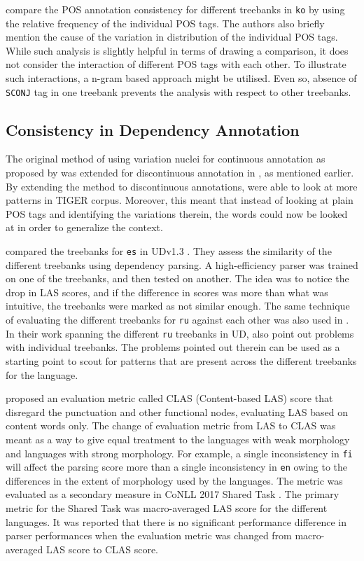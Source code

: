 \cite{korean} compare the POS annotation consistency for different treebanks in \verb|ko| by using the relative frequency of the individual POS tags. The authors also briefly mention the cause of the variation in distribution of the individual POS tags. While such analysis is slightly helpful in terms of drawing a comparison, it does not consider the interaction of different POS tags with each other. To illustrate such interactions, a n-gram based approach might be utilised. Even so, absence of \verb|SCONJ| tag in one treebank prevents the analysis with respect to other treebanks.

\subsection{Consistency in Dependency Annotation}
\label{ssec:inconsistency-detection-deprel}

The original method of using variation nuclei for continuous annotation as proposed by \cite{dickinson03a, dickinson03b} was extended for discontinuous annotation in \cite{dickinson05}, as mentioned earlier. By extending the method to discontinuous annotations, \citeauthor{dickinson05} were able to look at more patterns in TIGER corpus. Moreover, this meant that instead of looking at plain POS tags and identifying the variations therein, the words could now be looked at in order to generalize the context.

\cite{alonso2016universal} compared the treebanks for \verb|es| in UDv1.3 \citep{UDv1.3}. They assess the similarity of the different treebanks using dependency parsing. A high-efficiency parser was trained on one of the treebanks, and then tested on another. The idea was to notice the drop in LAS scores, and if the difference in scores was more than what was intuitive, the treebanks were marked as not similar enough. The same technique of evaluating the different treebanks for \verb|ru| against each other was also used in \cite{RussianTreebanks}. In their work spanning the different \verb|ru| treebanks in UD, \citeauthor{RussianTreebanks} also point out problems with individual treebanks. The problems pointed out therein can be used as a starting point to scout for patterns that are present across the different treebanks for the language. 

\cite{CLAS} proposed an evaluation metric called CLAS (Content-based LAS) score that disregard the punctuation and other functional nodes, evaluating LAS based on content words only. The change of evaluation metric from LAS to CLAS was meant as a way to give equal treatment to the languages with weak morphology and languages with strong morphology. For example, a single inconsistency in \verb|fi| will affect the parsing score more than a single inconsistency in \verb|en| owing to the differences in the extent of morphology used by the languages. The metric was evaluated as a secondary measure in CoNLL 2017 Shared Task \citep{CLAS_test}. The primary metric for the Shared Task was macro-averaged LAS score for the different languages. It was reported that there is no significant performance difference in parser performances when the evaluation metric was changed from macro-averaged LAS score to CLAS score.

